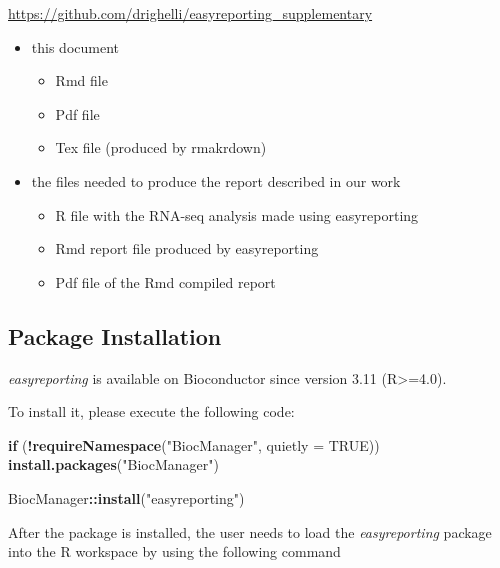 \documentclass[]{article}
\newenvironment{Shaded}{\begin{snugshade}}{\end{snugshade}}
\newcommand{\ControlFlowTok}[1]{\textcolor[rgb]{0.13,0.29,0.53}{\textbf{#1}}}
\newcommand{\DataTypeTok}[1]{\textcolor[rgb]{0.13,0.29,0.53}{#1}}
\newcommand{\KeywordTok}[1]{\textcolor[rgb]{0.13,0.29,0.53}{\textbf{#1}}}
\newcommand{\NormalTok}[1]{#1}
\newcommand{\OperatorTok}[1]{\textcolor[rgb]{0.81,0.36,0.00}{\textbf{#1}}}
\newcommand{\OtherTok}[1]{\textcolor[rgb]{0.56,0.35,0.01}{#1}}
\newcommand{\StringTok}[1]{\textcolor[rgb]{0.31,0.60,0.02}{#1}}
\providecommand{\tightlist}{%
  \setlength{\itemsep}{0pt}\setlength{\parskip}{0pt}}
\begin{document}
\url{https://github.com/drighelli/easyreporting_supplementary}

\begin{itemize}
\tightlist
\item
  this document

  \begin{itemize}
  \tightlist
  \item
    Rmd file
  \item
    Pdf file
  \item
    Tex file (produced by rmakrdown)
  \end{itemize}
\item
  the files needed to produce the report described in our work

  \begin{itemize}
  \tightlist
  \item
    R file with the RNA-seq analysis made using easyreporting
  \item
    Rmd report file produced by easyreporting
  \item
    Pdf file of the Rmd compiled report
  \end{itemize}
\end{itemize}

\hypertarget{package-installation}{%
\subsection{Package Installation}\label{package-installation}}

\emph{easyreporting} is available on Bioconductor since version 3.11
(R\textgreater{}=4.0).

To install it, please execute the following code:

\begin{Shaded}
\begin{Highlighting}[]
\ControlFlowTok{if}\NormalTok{ (}\OperatorTok{!}\KeywordTok{requireNamespace}\NormalTok{(}\StringTok{"BiocManager"}\NormalTok{, }\DataTypeTok{quietly =} \OtherTok{TRUE}\NormalTok{))}
    \KeywordTok{install.packages}\NormalTok{(}\StringTok{"BiocManager"}\NormalTok{)}

\NormalTok{BiocManager}\OperatorTok{::}\KeywordTok{install}\NormalTok{(}\StringTok{"easyreporting"}\NormalTok{)}
\end{Highlighting}
\end{Shaded}

After the package is installed, the user needs to load the
\emph{easyreporting} package into the R workspace by using the following
command
\end{document}
